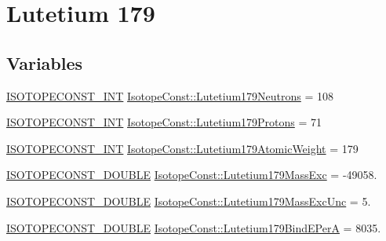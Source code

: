 \hypertarget{group___isotope_const-_lutetium-_lu179}{}\section{Lutetium 179}
\label{group___isotope_const-_lutetium-_lu179}
\subsection*{Variables}
\begin{DoxyCompactItemize}
\item 
\mbox{\hyperlink{group___isotope_const-_macros_ga5f18360b3e99483a35c32d789e62621c}{I\+S\+O\+T\+O\+P\+E\+C\+O\+N\+S\+T\+\_\+\+I\+NT}} \mbox{\hyperlink{group___isotope_const-_lutetium-_lu179_ga11755cf71c78ce0358a829ee98d11dae}{Isotope\+Const\+::\+Lutetium179\+Neutrons}} = 108
\item 
\mbox{\hyperlink{group___isotope_const-_macros_ga5f18360b3e99483a35c32d789e62621c}{I\+S\+O\+T\+O\+P\+E\+C\+O\+N\+S\+T\+\_\+\+I\+NT}} \mbox{\hyperlink{group___isotope_const-_lutetium-_lu179_gaa9bcd609b3e2886e595a5dfa4debc75b}{Isotope\+Const\+::\+Lutetium179\+Protons}} = 71
\item 
\mbox{\hyperlink{group___isotope_const-_macros_ga5f18360b3e99483a35c32d789e62621c}{I\+S\+O\+T\+O\+P\+E\+C\+O\+N\+S\+T\+\_\+\+I\+NT}} \mbox{\hyperlink{group___isotope_const-_lutetium-_lu179_ga83b3acfd77776cd5270e45a99feca401}{Isotope\+Const\+::\+Lutetium179\+Atomic\+Weight}} = 179
\item 
\mbox{\hyperlink{group___isotope_const-_macros_ga8f45a7272ce02c0b4c65c44636ed719a}{I\+S\+O\+T\+O\+P\+E\+C\+O\+N\+S\+T\+\_\+\+D\+O\+U\+B\+LE}} \mbox{\hyperlink{group___isotope_const-_lutetium-_lu179_ga3d8942d819cbcd9e32ee6bdf21cbe761}{Isotope\+Const\+::\+Lutetium179\+Mass\+Exc}} = -\/49058.
\item 
\mbox{\hyperlink{group___isotope_const-_macros_ga8f45a7272ce02c0b4c65c44636ed719a}{I\+S\+O\+T\+O\+P\+E\+C\+O\+N\+S\+T\+\_\+\+D\+O\+U\+B\+LE}} \mbox{\hyperlink{group___isotope_const-_lutetium-_lu179_ga760c837b382eb3dece86cbfa6b5bd4d8}{Isotope\+Const\+::\+Lutetium179\+Mass\+Exc\+Unc}} = 5.
\item 
\mbox{\hyperlink{group___isotope_const-_macros_ga8f45a7272ce02c0b4c65c44636ed719a}{I\+S\+O\+T\+O\+P\+E\+C\+O\+N\+S\+T\+\_\+\+D\+O\+U\+B\+LE}} \mbox{\hyperlink{group___isotope_const-_lutetium-_lu179_gaf3dbb08963d11a4c04f65ce1ba6c59bc}{Isotope\+Const\+::\+Lutetium179\+Bind\+E\+PerA}} = 8035.
\item 

\end{DoxyCompactItemize}
